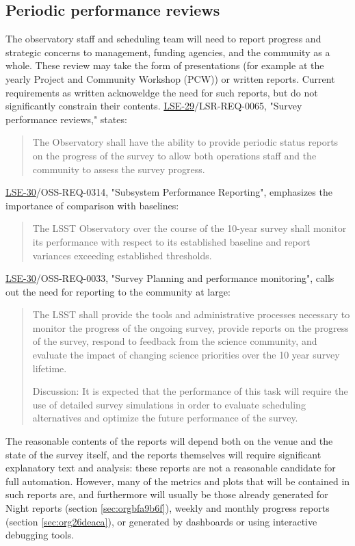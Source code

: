 \subsection{Periodic performance reviews}
\label{sec:orge53ad2f}
The observatory staff and scheduling team will need to report progress and strategic concerns to management, funding agencies, and the community as a whole.
These review may take the form of presentations (for example at the yearly Project and Community Workshop (PCW)) or written reports.
Current requirements as written acknoweldge the need for such reports, but do not significantly constrain their contents. 
\href{https://ls.st/lse-29}{LSE-29}/LSR-REQ-0065, "Survey performance reviews," states:
\begin{quote}
The Observatory shall have the ability to provide periodic status
reports on the progress of the survey to allow both operations staff
and the community to assess the survey progress.
\end{quote}
\href{https://ls.st/lse-30}{LSE-30}/OSS-REQ-0314, "Subsystem Performance Reporting", emphasizes the importance of comparison with baselines:
\begin{quote}
The LSST Observatory over the course of the 10-year survey shall monitor its performance with respect to its established baseline and report variances exceeding established thresholds.
\end{quote}
\href{https://ls.st/lse-30}{LSE-30}/OSS-REQ-0033, "Survey Planning and performance monitoring", calls out the need for reporting to the community at large:
\begin{quote}
The LSST shall provide the tools and administrative processes
necessary to monitor the progress of the ongoing survey, provide
reports on the progress of the survey, respond to feedback from the
science community, and evaluate the impact of changing science
priorities over the 10 year survey lifetime.

Discussion: It is expected that the performance of this task will
require the use of detailed survey simulations in order to evaluate
scheduling alternatives and optimize the future performance of the
survey.
\end{quote}

The reasonable contents of the reports will depend both on the venue and the state of the survey itself, and the reports themselves will require significant explanatory text and analysis: these reports are not a reasonable candidate for full automation.
However, many of the metrics and plots that will be contained in such reports are, and furthermore will usually be those already generated for Night reports (section \ref{sec:orgbfa9b6f}), weekly and monthly progress reports (section \ref{sec:org26deaca}), or generated by dashboards or using interactive debugging tools.

